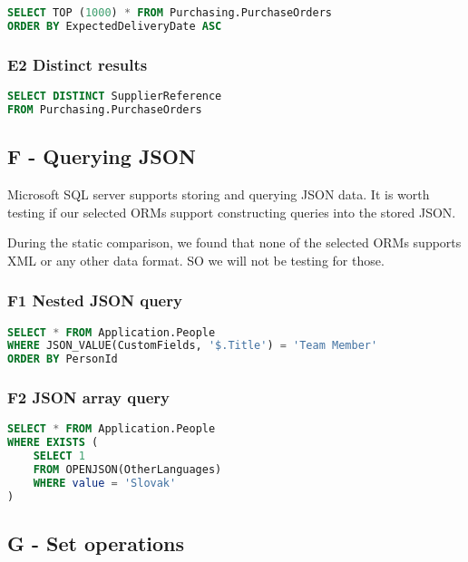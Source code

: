 \begin{lstlisting}[language=SQL]
SELECT TOP (1000) * FROM Purchasing.PurchaseOrders 
ORDER BY ExpectedDeliveryDate ASC
\end{lstlisting}

\subsubsection*{E2 Distinct results}

\begin{lstlisting}[language=SQL]
SELECT DISTINCT SupplierReference 
FROM Purchasing.PurchaseOrders
\end{lstlisting}

\subsection{F - Querying JSON}
Microsoft SQL server supports storing and querying JSON data\cite{mssqljson}. It is worth testing if our selected ORMs support constructing queries into the stored JSON.

During the static comparison, we found that none of the selected ORMs supports XML or any other data format. SO we will not be testing for those.

\subsubsection*{F1 Nested JSON query}

\begin{lstlisting}[language=SQL]
SELECT * FROM Application.People
WHERE JSON_VALUE(CustomFields, '$.Title') = 'Team Member'
ORDER BY PersonId
\end{lstlisting}

\subsubsection*{F2 JSON array query}

\begin{lstlisting}[language=SQL]
SELECT * FROM Application.People
WHERE EXISTS (
    SELECT 1
    FROM OPENJSON(OtherLanguages)
    WHERE value = 'Slovak'
)
\end{lstlisting}

\subsection{G - Set operations}

